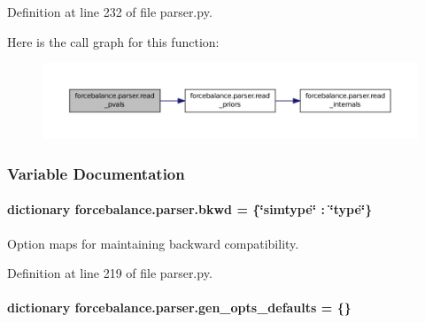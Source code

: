 Definition at line 232 of file parser.\-py.



Here is the call graph for this function\-:
\nopagebreak
\begin{figure}[H]
\begin{center}
\leavevmode
\includegraphics[width=350pt]{namespaceforcebalance_1_1parser_a56fb1e139dad24bac29f25a3870765ca_cgraph}
\end{center}
\end{figure}




\subsubsection{Variable Documentation}
\hypertarget{namespaceforcebalance_1_1parser_a121eaaef101563523a8fb20bd5ace409}{
\paragraph[{bkwd}]{\setlength{\rightskip}{0pt plus 5cm}dictionary forcebalance.\-parser.\-bkwd = \{\char`\"{}simtype\char`\"{} \-: \char`\"{}type\char`\"{}\}}}\label{namespaceforcebalance_1_1parser_a121eaaef101563523a8fb20bd5ace409}


Option maps for maintaining backward compatibility. 



Definition at line 219 of file parser.\-py.

\hypertarget{namespaceforcebalance_1_1parser_a980fd024b1f2877247de482247250b9e}{
\paragraph[{gen\-\_\-opts\-\_\-defaults}]{\setlength{\rightskip}{0pt plus 5cm}dictionary forcebalance.\-parser.\-gen\-\_\-opts\-\_\-defaults = \{\}}}\label{namespaceforcebalance_1_1parser_a980fd024b1f2877247de482247250b9e}


